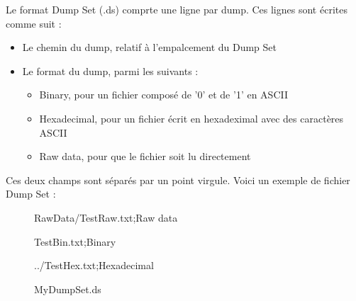 Le format Dump Set (.ds) comprte une ligne par dump.
Ces lignes sont écrites comme suit :

\begin{itemize}
        \item Le chemin du dump, relatif à l'empalcement du Dump Set
        \item Le format du dump, parmi les suivants :
        \begin{itemize}
                \item Binary, pour un fichier composé de '0' et de  '1' en ASCII
                \item Hexadecimal, pour un fichier écrit en hexadeximal avec des caractères ASCII
                \item Raw data, pour que le fichier soit lu directement
        \end{itemize}
\end{itemize}

Ces deux champs sont séparés par un point virgule.
Voici un exemple de fichier Dump Set : 

\begin{figure}[!h]
  \begin{center}
  RawData/TestRaw.txt;Raw data


  TestBin.txt;Binary


  ../TestHex.txt;Hexadecimal
  \end{center}
  \caption{MyDumpSet.ds}
  \label{dump_set_fromat}
\end{figure}
